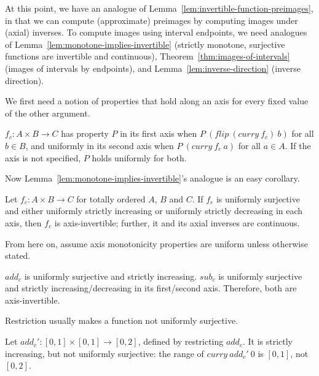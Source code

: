 \documentclass[preprint]{sigplanconf}
\begin{document}
At this point, we have an analogue of Lemma~\ref{lem:invertible-function-preimages}, in that we can compute (approximate) preimages by computing images under (axial) inverses.
To compute images using interval endpoints, we need analogues of Lemma~\ref{lem:monotone-implies-invertible} (strictly monotone, surjective functions are invertible and continuous), Theorem~\ref{thm:images-of-intervals} (images of intervals by endpoints), and Lemma~\ref{lem:inverse-direction} (inverse direction).

We first need a notion of properties that hold along an axis for every fixed value of the other argument.

\begin{definition}
$f_c : A \times B \to C$ has property $P$  in its first axis when $P~(flip~(curry~f_c)~b)$ for all $b \in B$, and uniformly in its second axis when $P~(curry~f_c~a)$ for all $a \in A$.
If the axis is not specified, $P$ holds uniformly for both.
\end{definition}

Now Lemma~\ref{lem:monotone-implies-invertible}'s analogue is an easy corollary.

\begin{lemma}
\label{lem:uniformly-monotone-implies-invertible}
Let $f_c : A \times B \to C$ for totally ordered $A$, $B$ and $C$.
If $f_c$ is uniformly surjective and either uniformly strictly increasing or uniformly strictly decreasing in each axis, then $f_c$ is axis-invertible; further, it and its axial inverses are continuous.
\end{lemma}

From here on, assume axis monotonicity properties are uniform unless otherwise stated.

\begin{example}
$add_c$ is uniformly surjective and strictly increasing.
$sub_c$ is uniformly surjective and strictly increasing/decreasing in its first/second axis.
Therefore, both are axis-invertible.
\exampleqed
\end{example}

Restriction usually makes a function not uniformly surjective.

\begin{example}
Let $add_c' : [0,1] \times [0,1] \to [0,2]$, defined by restricting $add_c$.
It is strictly increasing, but not uniformly surjective: the range of $curry~add_c'~0$ is $[0,1]$, not $[0,2]$.
\exampleqed
\end{example}
\end{document}
